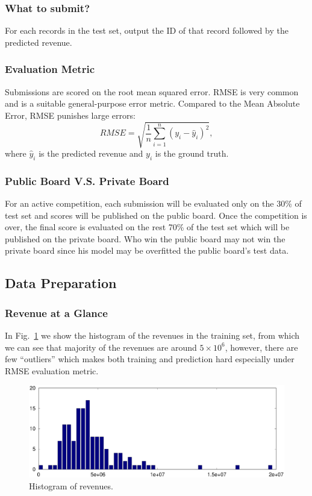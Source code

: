 \documentclass[10pt, oneside]{article}   	%
\newcommand\figref{Fig.~\ref}
\begin{document}
\subsubsection{What to submit?}
For each records in the test set, output the ID of that record followed by the predicted revenue.

\subsubsection{Evaluation Metric}
Submissions are scored on the root mean squared error. 
RMSE is very common and is a suitable general-purpose error metric. 
Compared to the Mean Absolute Error, RMSE punishes large errors:
\begin{equation*}
RMSE = \sqrt{\frac{1}{n} \sum_{i=1}^{n} (y_i - \hat{y}_i)^2 }, 
\end{equation*}
where $\hat{y}_i$ is the predicted revenue and $y_i$ is the ground truth.

\subsubsection{Public Board V.S. Private Board}
For an active competition, each submission will be evaluated only on the 30\% of test set and scores will be published on the public board.
Once the competition is over, the final score is evaluated on the rest 70\% of the test set which will be published on the private board. 
Who win the public board may not win the private board since his model may be overfitted the public board's test data.
   
\subsection{Data Preparation}
\subsubsection{Revenue at a Glance}
In \figref{fig:revenue} we show the histogram of the revenues in the training set, from which we can see that majority of the revenues are around $5 \times 10^6$, 
however, there are few ``outliers'' which makes both training and prediction hard especially under RMSE evaluation metric.

\begin{figure}[htbp] %
   \centering
   \includegraphics[width=5in]{figs/revenue.eps} 
   \caption{Histogram of revenues.}
   \label{fig:revenue}
\end{figure}
\end{document}
